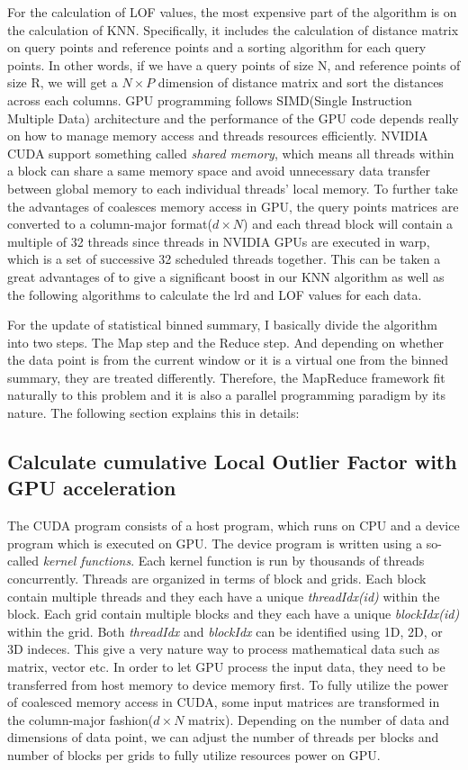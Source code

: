 \documentclass[11pt]{article}       %
\begin{document}
For the calculation of LOF values, the most expensive part of the algorithm is on the calculation of KNN. Specifically, it includes the calculation of distance matrix on query points and reference points and a sorting algorithm for each query points. In other words, if we have a query points of size N, and reference points of size R, we will get a $N \times P$ dimension of distance matrix and sort the distances across each columns. GPU programming follows SIMD(Single Instruction Multiple Data) architecture and the performance of the GPU code depends really on how to manage memory access and threads resources efficiently. NVIDIA CUDA support something called \textit{shared memory}, which means all threads within a block can share a same memory space and avoid unnecessary data transfer between global memory to each individual threads' local memory. To further take the advantages of coalesces memory access in GPU, the query points matrices are converted to a column-major format($d \times N$) and each thread block will contain a multiple of 32 threads since threads in NVIDIA GPUs are executed in warp, which is a set of successive 32 scheduled threads together. This can be taken a great advantages of to give a significant boost in our KNN algorithm as well as the following algorithms to calculate the lrd and LOF values for each data. 

For the update of statistical binned summary, I basically divide the algorithm into two steps. The Map step and the Reduce step. And depending on whether the data point is from the current window or it is a virtual one from the binned summary, they are treated differently. Therefore, the MapReduce framework fit naturally to this problem and it is also a parallel programming paradigm by its nature. The following section explains this in details:

\subsection{Calculate cumulative Local Outlier Factor with GPU acceleration}

The CUDA program consists of a host program, which runs on CPU and a device program which is executed on GPU. The device program is written using a so-called \textit{kernel functions}. Each kernel function is run by thousands of threads concurrently. Threads are organized in terms of block and grids. Each block contain multiple threads and they each have a unique \textit{threadIdx(id)} within the block. Each grid contain multiple blocks and they each have a unique \textit{blockIdx(id)} within the grid. Both \textit{threadIdx} and \textit{blockIdx} can be identified using 1D, 2D, or 3D indeces. This give a very nature way to process mathematical data such as matrix, vector etc. In order to let GPU process the input data, they need to be transferred from host memory to device memory first. To fully utilize the power of coalesced memory access in CUDA, some input matrices are transformed in the column-major fashion($d \times N$ matrix). Depending on the number of data and dimensions of data point, we can adjust the number of threads per blocks and number of blocks per grids to fully utilize resources power on GPU. 
\end{document}
